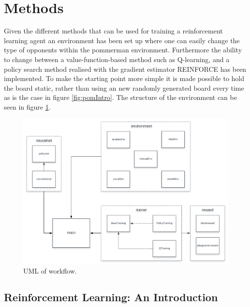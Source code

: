 \section{Methods}
Given the different methods that can be used for training a reinforcement learning agent an environment has been set up where one can easily change the type of opponents within the pommerman environment. Furthermore the ability to change between a value-function-based method such as Q-learning, and a policy search method realised with the gradient estimator REINFORCE has been implemented.\cite{sutton1998a} To make the starting point more simple it is made possible to hold the board static, rather than using an new randomly generated board every time as is the case in figure \ref{fig:pomIntro}. The structure of the environment can be seen in figure \ref{fig:uml}.

\begin{figure}[htb]
    \centerline{\includegraphics[width=0.8\linewidth]{docs/article/inputs/02456-UML.pdf}}
    \caption{UML of workflow.}\label{fig:uml}
\end{figure}











\subsection{Reinforcement Learning: An Introduction} %

